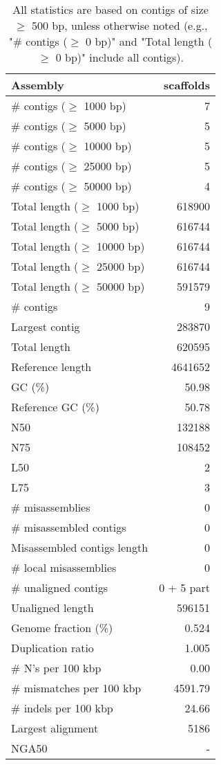 \documentclass[12pt,a4paper]{article}
\begin{document}
\begin{table}[ht]
\begin{center}
\caption{All statistics are based on contigs of size $\geq$ 500 bp, unless otherwise noted (e.g., "\# contigs ($\geq$ 0 bp)" and "Total length ($\geq$ 0 bp)" include all contigs).}
\begin{tabular}{|l*{1}{|r}|}
\hline
Assembly & scaffolds \\ \hline
\# contigs ($\geq$ 1000 bp) & 7 \\ \hline
\# contigs ($\geq$ 5000 bp) & 5 \\ \hline
\# contigs ($\geq$ 10000 bp) & 5 \\ \hline
\# contigs ($\geq$ 25000 bp) & 5 \\ \hline
\# contigs ($\geq$ 50000 bp) & 4 \\ \hline
Total length ($\geq$ 1000 bp) & 618900 \\ \hline
Total length ($\geq$ 5000 bp) & 616744 \\ \hline
Total length ($\geq$ 10000 bp) & 616744 \\ \hline
Total length ($\geq$ 25000 bp) & 616744 \\ \hline
Total length ($\geq$ 50000 bp) & 591579 \\ \hline
\# contigs & 9 \\ \hline
Largest contig & 283870 \\ \hline
Total length & 620595 \\ \hline
Reference length & 4641652 \\ \hline
GC (\%) & 50.98 \\ \hline
Reference GC (\%) & 50.78 \\ \hline
N50 & 132188 \\ \hline
N75 & 108452 \\ \hline
L50 & 2 \\ \hline
L75 & 3 \\ \hline
\# misassemblies & 0 \\ \hline
\# misassembled contigs & 0 \\ \hline
Misassembled contigs length & 0 \\ \hline
\# local misassemblies & 0 \\ \hline
\# unaligned contigs & 0 + 5 part \\ \hline
Unaligned length & 596151 \\ \hline
Genome fraction (\%) & 0.524 \\ \hline
Duplication ratio & 1.005 \\ \hline
\# N's per 100 kbp & 0.00 \\ \hline
\# mismatches per 100 kbp & 4591.79 \\ \hline
\# indels per 100 kbp & 24.66 \\ \hline
Largest alignment & 5186 \\ \hline
NGA50 & - \\ \hline
\end{tabular}
\end{center}
\end{table}
\end{document}
